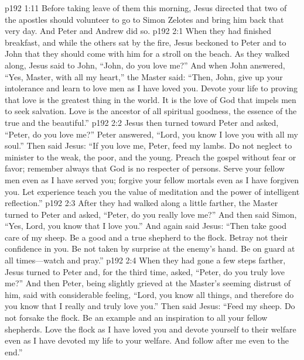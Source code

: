 \vs p192 1:11 Before taking leave of them this morning, Jesus directed that two of the apostles should volunteer to go to Simon Zelotes and bring him back that very day. And Peter and Andrew did so.
\vs p192 2:1 When they had finished breakfast, and while the others sat by the fire, Jesus beckoned to Peter and to John that they should come with him for a stroll on the beach. As they walked along, Jesus said to John, \textcolor{ubdarkred}{“John, do you love me?”} And when John answered, “Yes, Master, with all my heart,” the Master said: \textcolor{ubdarkred}{“Then, John, give up your intolerance and learn to love men as I have loved you. Devote your life to proving that love is the greatest thing in the world. It is the love of God that impels men to seek salvation. Love is the ancestor of all spiritual goodness, the essence of the true and the beautiful.”}
\vs p192 2:2 Jesus then turned toward Peter and asked, \textcolor{ubdarkred}{“Peter, do you love me?”} Peter answered, “Lord, you know I love you with all my soul.” Then said Jesus: \textcolor{ubdarkred}{“If you love me, Peter, feed my lambs. Do not neglect to minister to the weak, the poor, and the young. Preach the gospel without fear or favor; remember always that God is no respecter of persons. Serve your fellow men even as I have served you; forgive your fellow mortals even as I have forgiven you. Let experience teach you the value of meditation and the power of intelligent reflection.”}
\vs p192 2:3 After they had walked along a little farther, the Master turned to Peter and asked, \textcolor{ubdarkred}{“Peter, do you really love me?”} And then said Simon, “Yes, Lord, you know that I love you.” And again said Jesus: \textcolor{ubdarkred}{“Then take good care of my sheep. Be a good and a true shepherd to the flock. Betray not their confidence in you. Be not taken by surprise at the enemy’s hand. Be on guard at all times---watch and pray.”}
\vs p192 2:4 When they had gone a few steps farther, Jesus turned to Peter and, for the third time, asked, \textcolor{ubdarkred}{“Peter, do you truly love me?”} And then Peter, being slightly grieved at the Master’s seeming distrust of him, said with considerable feeling, “Lord, you know all things, and therefore do you know that I really and truly love you.” Then said Jesus: \textcolor{ubdarkred}{“Feed my sheep. Do not forsake the flock. Be an example and an inspiration to all your fellow shepherds. Love the flock as I have loved you and devote yourself to their welfare even as I have devoted my life to your welfare. And follow after me even to the end.”}
